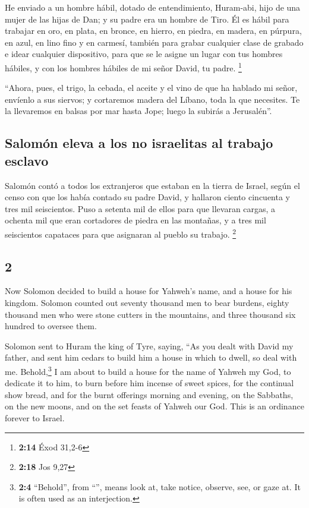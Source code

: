 \begin{paracol}{2}
 He enviado a un hombre hábil, dotado de entendimiento,
Huram-abi,  hijo de una mujer de las hijas de Dan; y su
padre era un hombre de Tiro. Él es hábil para trabajar en oro, en plata,
en bronce, en hierro, en piedra, en madera, en púrpura, en azul, en lino
fino y en carmesí, también para grabar cualquier clase de grabado e
idear cualquier dispositivo, para que se le asigne un lugar con tus
hombres hábiles, y con los hombres hábiles de mi señor David, tu padre.
\footnote{\textbf{2:14} Éxod 31,2-6}

 ``Ahora, pues, el trigo, la cebada, el aceite y el vino
de que ha hablado mi señor, envíenlo a sus siervos;  y
cortaremos madera del Líbano, toda la que necesites. Te la llevaremos en
balsas por mar hasta Jope; luego la subirás a Jerusalén''.

\hypertarget{salomuxf3n-eleva-a-los-no-israelitas-al-trabajo-esclavo}{%
\subsection{Salomón eleva a los no israelitas al trabajo
esclavo}\label{salomuxf3n-eleva-a-los-no-israelitas-al-trabajo-esclavo}}

 Salomón contó a todos los extranjeros que estaban en la
tierra de Israel, según el censo con que los había contado su padre
David, y hallaron ciento cincuenta y tres mil seiscientos.
 Puso a setenta mil de ellos para que llevaran cargas, a
ochenta mil que eran cortadores de piedra en las montañas, y a tres mil
seiscientos capataces para que asignaran al pueblo su trabajo.
\footnote{\textbf{2:18} Jos 9,27}

\switchcolumn
\begin{otherlanguage}{english}

\hypertarget{section-3}{%
\section{2}\label{section-3}}

 Now Solomon decided to build a house for Yahweh's name,
and a house for his kingdom.  Solomon counted out seventy
thousand men to bear burdens, eighty thousand men who were stone cutters
in the mountains, and three thousand six hundred to oversee them.

 Solomon sent to Huram the king of Tyre, saying, ``As you
dealt with David my father, and sent him cedars to build him a house in
which to dwell, so deal with me.  Behold,\footnote{\textbf{2:4}
  ``Behold'', from ``'', means look at, take notice,
  observe, see, or gaze at. It is often used as an interjection.} I am
about to build a house for the name of Yahweh my God, to dedicate it to
him, to burn before him incense of sweet spices, for the continual show
bread, and for the burnt offerings morning and evening, on the Sabbaths,
on the new moons, and on the set feasts of Yahweh our God. This is an
ordinance forever to Israel.


\end{otherlanguage}
\end{paracol}

